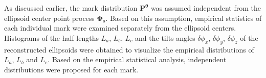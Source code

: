 \documentclass[journal]{IEEEtran}
\begin{document}

As discussed earlier, the mark distribution
$\mathbf{P}^{\boldsymbol{\theta}}$ was assumed independent from the
ellipsoid center point process $\mathbf{\Phi_{s}}$. Based on this
assumption, empirical statistics of each individual mark were examined
separately from the ellipsoid centers. Histograms of the half lengths
$L_a$, $L_b$, $L_c$ and the tilts angles $\delta\phi_x$,
$\delta\phi_y$, $\delta\phi_z$ of the reconstructed ellipsoids were
obtained to visualize the empirical distributions of $L_a$, $L_b$ and
$L_c$. Based on the empirical statistical analysis, independent
distributions were proposed for each mark.

%
%

\end{document}
